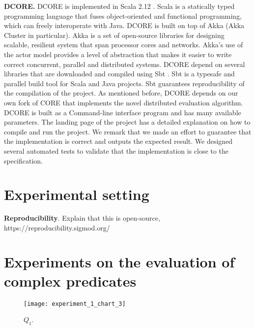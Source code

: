 \textbf{DCORE.} DCORE is implemented in Scala 2.12 \cite{scala}. Scala \cite{scala} is a statically typed programming language that fuses object-oriented and functional programming, which can freely interoperate with Java. DCORE is built on top of Akka \cite{akka} (Akka Cluster in particular). Akka is a set of open-source libraries for designing scalable, resilient system that span processor cores and networks. Akka’s use of the actor model provides a level of abstraction that makes it easier to write correct concurrent, parallel and distributed systems. DCORE depend on several libraries that are downloaded and compiled using Sbt \cite{sbt}. Sbt is a typesafe and parallel build tool for Scala and Java projects. Sbt guarantees reproducibility of the compilation of the project. As mentioned before, DCORE depends on our own fork of CORE that implements the novel distributed evaluation algorithm. DCORE is built as a Command-line interface program and has many available parameters. The landing page of the project has a detailed explanation on how to compile and run the project. We remark that we made an effort to guarantee that the implementation is correct and outputs the expected result. We designed several automated tests to validate that the implementation is close to the specification.

\section{Experimental setting}\label{sec:setup}




\textbf{Reproducibility}. Explain that this is open-source, https://reproducibility.sigmod.org/

\section{Experiments on the evaluation of complex predicates}\label{sec:predicates}


\begin{figure}[H]
  \centering
  \texttt{[image: experiment\_1\_chart\_3]}
  \caption{$Q_{1}$.}
  \label{fig:???}
\end{figure}

